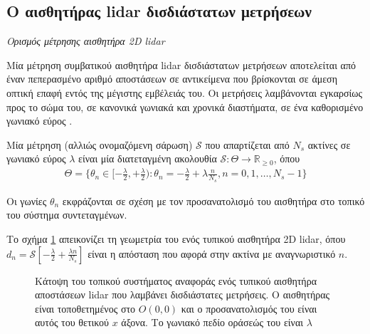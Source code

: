 \subsection{Ο αισθητήρας lidar δισδιάστατων μετρήσεων}
\label{subsec:01_01_02_4}

\begin{bw_box}
\begin{definition}
  \label{def:lidar}
  \textit{Ορισμός μέτρησης αισθητήρα 2D lidar}

  Μία μέτρηση συμβατικού αισθητήρα lidar δισδιάστατων μετρήσεων αποτελείται από
  έναν πεπερασμένο αριθμό αποστάσεων σε αντικείμενα που βρίσκονται σε άμεση
  οπτική επαφή εντός της μέγιστης εμβέλειάς του. Οι μετρήσεις λαμβάνονται
  εγκαρσίως προς το σώμα του, σε κανονικά γωνιακά και χρονικά διαστήματα, σε
  ένα καθορισμένο γωνιακό εύρος \cite{Cooper2018a}.

  Μία μέτρηση (αλλιώς ονομαζόμενη σάρωση) $\mathcal{S}$ που απαρτίζεται από
  $N_s$ ακτίνες σε γωνιακό εύρος $\lambda$ είναι μία διατεταγμένη ακολουθία
  $\mathcal{S} : \Theta \rightarrow
  \mathbb{R}_{\geq 0}$, όπου
  \begin{align}
  \Theta = \{\theta_n \in [-\frac{\lambda}{2}, +\frac{\lambda}{2}) :
    \theta_n = -\frac{\lambda}{2} + \lambda \frac{n}{N_s},
  n = 0,1,\dots, N_s-1\}
  \end{align}

  Οι γωνίες $\theta_n$ εκφράζονται σε σχέση με τον προσανατολισμό του αισθητήρα
  στο τοπικό του σύστημα συντεταγμένων.
\end{definition}
\end{bw_box}

Το σχήμα \ref{fig:laser} απεικονίζει τη γεωμετρία του ενός τυπικού αισθητήρα
2D lidar, όπου $d_n = \mathcal{S}[-\frac{\lambda}{2} + \frac{\lambda n}{N_s}]$
είναι η απόσταση που αφορά στην ακτίνα με αναγνωριστικό $n$.

\begin{figure}[htbp]\centering
  
  \caption{\small Κάτοψη του τοπικού συστήματος αναφοράς ενός τυπικού αισθητήρα
           αποστάσεων lidar που λαμβάνει δισδιάστατες μετρήσεις. Ο αισθητήρας
           είναι τοποθετημένος στο $O(0,0)$ και ο προσανατολισμός του είναι
           αυτός του θετικού $x$ άξονα. Το γωνιακό πεδίο οράσεώς του είναι
           $\lambda$}
  \label{fig:laser}
\end{figure}

